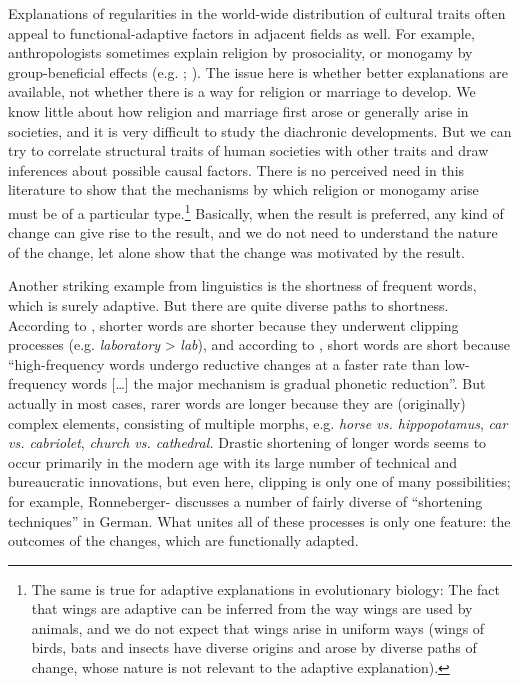 \documentclass[output=paper]{langsci/langscibook}
\begin{document}
Explanations of regularities in the world-wide distribution of cultural traits often appeal to functional-adaptive factors in adjacent fields as well. For example, anthropologists sometimes explain religion by prosociality, or monogamy by group-beneficial effects (e.g. \citealt{PaciottiEtAl2012}; \citealt{HenrichEtAl2012}). The issue here is whether better explanations are available, not whether there is a way for religion or marriage to develop. We know little about how religion and marriage first arose or generally arise in societies, and it is very difficult to study the diachronic developments. But we can try to correlate structural traits of human societies with other traits and draw inferences about possible causal factors. There is no perceived need in this literature to show that the mechanisms by which religion or monogamy arise must be of a particular type.\footnote{The same is true for adaptive explanations in evolutionary biology: The fact that wings are adaptive can be inferred from the way wings are used by animals, and we do not expect that wings arise in uniform ways (wings of birds, bats and insects have diverse origins and arose by diverse paths of change, whose nature is not relevant to the adaptive explanation).} Basically, when the result is preferred, any kind of change can give rise to the result, and we do not need to understand the nature of the change, let alone show that the change was motivated by the result.

Another striking example from linguistics is the shortness of frequent words, which is surely adaptive. But there are quite diverse paths to shortness. According to \citet{Zipf1935}, shorter words are shorter because they underwent clipping processes (e.g. \textit{laboratory} > \textit{lab}), and according to \citet[12]{Bybee2007}, short words are short because “high-frequency words undergo reductive changes at a faster rate than low-frequency words […] the major mechanism is gradual phonetic reduction”. But actually in most cases, rarer words are longer because they are (originally) complex elements, consisting of multiple morphs, e.g. \textit{horse vs. hippopotamus}, \textit{car vs. cabriolet}, \textit{church vs. cathedral.} Drastic shortening of longer words seems to occur primarily in the modern age with its large number of technical and bureaucratic innovations, but even here, clipping is only one of many possibilities; for example, Ronneberger-\citet{Sibold2014} discusses a number of fairly diverse of “shortening techniques” in German. What unites all of these processes is only one feature: the outcomes of the changes, which are functionally adapted.
\end{document}

